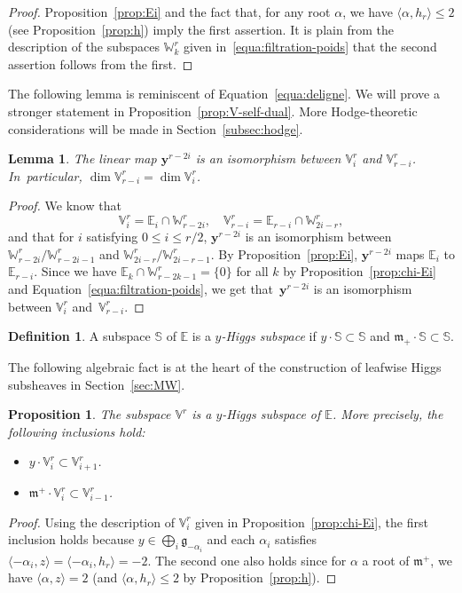 \documentclass[JEP,XML,SOM,Unicode,NoFloatCountersInSection]{cedram}
\theoremstyle{plain}
\newtheorem{lemm}[theo]{Lemma}
\newtheorem{prop}[theo]{Proposition}
\theoremstyle{definition}
\newtheorem{defi}[theo]{Definition}
\let\rgy r
\newcommand{\bE}{\mathbb{E}}
\newcommand{\bS}{\mathbb{S}}
\newcommand{\Vr}{\mathbb{V}^\rgy}
\newcommand{\Wr}{\mathbb{W}^\rgy}
\newcommand{\by}{\boldsymbol{y}}
\newcommand{\fgg}{\mathfrak{g}}
\newcommand{\fm}{\mathfrak{m}}
\newcommand{\scal}[1]{\langle #1 \rangle}
\begin{document}
\begin{proof}
Proposition~\ref{prop:Ei} and the fact that, for any root $\alpha$,
we have $\scal{\alpha, h_\rgy} \leq 2$ (see Proposition~\ref{prop:h}) imply the first assertion. It is plain from the description of the subspaces $\Wr_k$ given in~\eqref{equa:filtration-poids}
that the second assertion follows from the first.
\end{proof}

The following lemma is reminiscent of
Equation~\eqref{equa:deligne}. We will prove a stronger statement in
Proposition~\ref{prop:V-self-dual}. More Hodge-theoretic considerations will be made in
Section~\ref{subsec:hodge}.

\begin{lemm}
\label{lemm:dim-Vi}
The linear map $\by^{\rgy-2i}$ is an isomorphism between $\Vr_i$ and $\Vr_{\rgy-i}$. In~particular,
$\dim \Vr_{\rgy-i} = \dim \Vr_i$.
\end{lemm}

\begin{proof}
We know that $$\Vr_i=\bE_i\cap\Wr_{\rgy-2i},\quad
\Vr_{\rgy-i}=\bE_{\rgy-i}\cap\Wr_{2i-\rgy},$$ and that for $i$ satisfying \hbox{$0\leq i\leq \rgy/2$}, $\by^{\rgy-2i}$ is
an isomorphism between
$\Wr_{\rgy-2i}/\Wr_{\rgy-2i-1}$ and $\Wr_{2i-\rgy}/\Wr_{2i-\rgy-1}$. By Proposition~\ref{prop:Ei},
$\by^{\rgy-2i}$ maps $\bE_i$ to $\bE_{\rgy-i}$. Since we have \hbox{$\bE_k\!\cap\!\Wr_{\rgy-2k-1}\!=\!\{0\}$} for all $k$ by
Proposition~\ref{prop:chi-Ei} and Equation~\eqref{equa:filtration-poids}, we get that~$\by^{\rgy-2i}$ is an isomorphism between $\Vr_i$ and~$\Vr_{\rgy-i}$.
\end{proof}

\begin{defi}
\label{def:yHiggs}
A subspace $\bS$ of $\bE$ is a \emph{$y$-Higgs subspace} if $y\cdot\bS\subset\bS$ and
$\fm_+\cdot\bS\subset\bS$.
\end{defi}

The following algebraic fact is at the heart of the construction of leafwise Higgs subsheaves
in Section~\ref{sec:MW}.

\begin{prop}
\label{prop:algHiggs}
The subspace $\Vr$ is a $y$-Higgs subspace of $\bE$. More precisely, the following inclusions hold:
\begin{itemize}
\item $y \cdot \Vr_i \subset \Vr_{i+1}$.
\item $\fm^+ \cdot \Vr_i \subset \Vr_{i-1}$.
\end{itemize}
\end{prop}
\begin{proof}
Using the description of $\Vr_i$ given in Proposition~\ref{prop:chi-Ei}, the first inclusion
holds because $y \in \bigoplus_{i} \fgg_{-\alpha_i}$ and each $\alpha_i$ satisfies
$\scal{-\alpha_i,z}=\scal{-\alpha_i,h_\rgy}=-2$. The second one also holds since for $\alpha$ a root of
$\fm^+$, we have $\scal{\alpha,z}=2$ (and $\scal{\alpha,h_\rgy} \leq 2$ by Proposition~\ref{prop:h}).
\end{proof}
\end{document}
